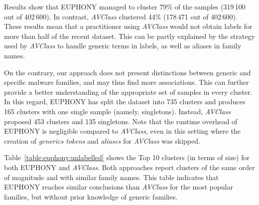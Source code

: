 

Results show that EUPHONY managed to cluster 79\% of the samples (319\,100 out of 402\,600).
In contrast, {\em AVClass} clustered 44\% (178\,471 out of 402\,600).
These results mean that a practitioner using {\em AVClass} would not obtain labels for more than half of the recent dataset.
This can be partly explained by the strategy used by {\em AVClass} to handle generic terms in labels, as well as aliases in family names.

On the contrary, our approach does not present distinctions between generic and specific malware families, and may thus find more associations.
This can further provide a better understanding of the appropriate set of samples in every cluster.
In this regard, EUPHONY has split the dataset into 735 clusters and produces 165 clusters with one single sample (namely, singletons).
Instead, {\em AVClass} proposed 453 clusters and 135 singletons.
Note that the runtime overhead of EUPHONY is negligible compared to {\em AVClass}, even in this setting where the creation of \textit{generics tokens} and \textit{aliases} for {\em AVClass} was skipped.



Table~\ref{table:euphony:unlabelled} shows the Top 10 clusters (in terms of size) for both EUPHONY and {\em AVClass}.
Both approaches report clusters of the same order of magnitude and with similar family names.
This table indicates that EUPHONY reaches similar conclusions than {\em AVClass} for the most popular families, but without prior knowledge of generic families.

